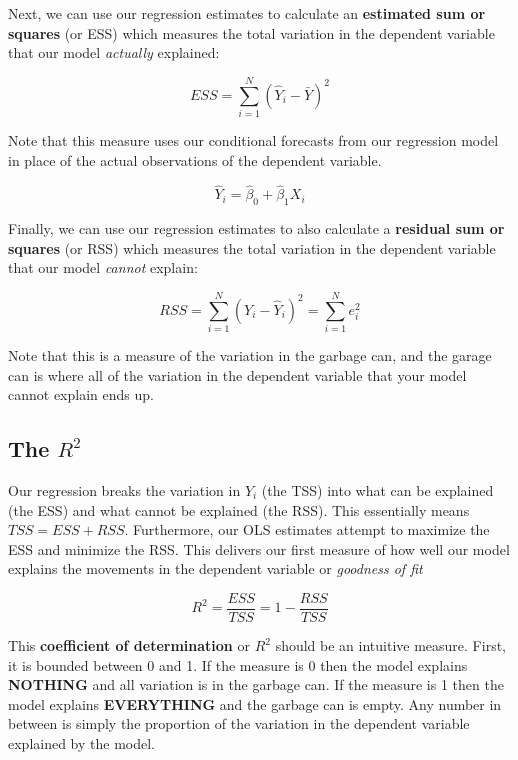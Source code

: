 \documentclass[
]{book}
\newenvironment{Shaded}{\begin{snugshade}}{\end{snugshade}}
\newcommand{\AttributeTok}[1]{\textcolor[rgb]{0.77,0.63,0.00}{#1}}
\newcommand{\FunctionTok}[1]{\textcolor[rgb]{0.00,0.00,0.00}{#1}}
\newcommand{\NormalTok}[1]{#1}
\newcommand{\OtherTok}[1]{\textcolor[rgb]{0.56,0.35,0.01}{#1}}
\newcommand{\SpecialCharTok}[1]{\textcolor[rgb]{0.00,0.00,0.00}{#1}}
\begin{document}
Next, we can use our regression estimates to calculate an \textbf{estimated sum or squares} (or ESS) which measures the total variation in the dependent variable that our model \emph{actually} explained:

\[ESS = \sum^{N}_{i=1}(\hat{Y}_i - \bar{Y})^2\]

Note that this measure uses our conditional forecasts from our regression model in place of the actual observations of the dependent variable.

\[\hat{Y}_i = \hat{\beta}_0 + \hat{\beta}_1 X_i\]

Finally, we can use our regression estimates to also calculate a \textbf{residual sum or squares} (or RSS) which measures the total variation in the dependent variable that our model \emph{cannot} explain:

\[RSS = \sum^{N}_{i=1}(Y_i - \hat{Y}_i)^2 = \sum^{N}_{i=1}e_i^2\]

Note that this is a measure of the variation in the garbage can, and the garage can is where all of the variation in the dependent variable that your model cannot explain ends up.

\hypertarget{the-r2}{%
\subsection{\texorpdfstring{The \(R^2\)}{The R\^{}2}}\label{the-r2}}

Our regression breaks the variation in \(Y_i\) (the TSS) into what can be explained (the ESS) and what cannot be explained (the RSS). This essentially means \(TSS=ESS+RSS\). Furthermore, our OLS estimates attempt to maximize the ESS and minimize the RSS. This delivers our first measure of how well our model explains the movements in the dependent variable or \emph{goodness of fit}

\[R^2 = \frac{ESS}{TSS} = 1 - \frac{RSS}{TSS}\]

This \textbf{coefficient of determination} or \(R^2\) should be an intuitive measure. First, it is bounded between 0 and 1. If the measure is 0 then the model explains \textbf{NOTHING} and all variation is in the garbage can. If the measure is 1 then the model explains \textbf{EVERYTHING} and the garbage can is empty. Any number in between is simply the proportion of the variation in the dependent variable explained by the model.

\begin{Shaded}
\end{Shaded}
\end{document}
